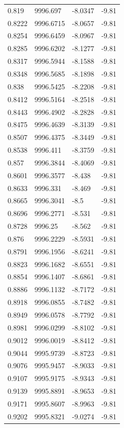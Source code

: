 \begin{table}[H]
\begin{tabular}{llll}
0.819 & 9996.697 & -8.0347 & -9.81 \\
0.8222 & 9996.6715 & -8.0657 & -9.81 \\
0.8254 & 9996.6459 & -8.0967 & -9.81 \\
0.8285 & 9996.6202 & -8.1277 & -9.81 \\
0.8317 & 9996.5944 & -8.1588 & -9.81 \\
0.8348 & 9996.5685 & -8.1898 & -9.81 \\
0.838 & 9996.5425 & -8.2208 & -9.81 \\
0.8412 & 9996.5164 & -8.2518 & -9.81 \\
0.8443 & 9996.4902 & -8.2828 & -9.81 \\
0.8475 & 9996.4639 & -8.3139 & -9.81 \\
0.8507 & 9996.4375 & -8.3449 & -9.81 \\
0.8538 & 9996.411 & -8.3759 & -9.81 \\
0.857 & 9996.3844 & -8.4069 & -9.81 \\
0.8601 & 9996.3577 & -8.438 & -9.81 \\
0.8633 & 9996.331 & -8.469 & -9.81 \\
0.8665 & 9996.3041 & -8.5 & -9.81 \\
0.8696 & 9996.2771 & -8.531 & -9.81 \\
0.8728 & 9996.25 & -8.562 & -9.81 \\
0.876 & 9996.2229 & -8.5931 & -9.81 \\
0.8791 & 9996.1956 & -8.6241 & -9.81 \\
0.8823 & 9996.1682 & -8.6551 & -9.81 \\
0.8854 & 9996.1407 & -8.6861 & -9.81 \\
0.8886 & 9996.1132 & -8.7172 & -9.81 \\
0.8918 & 9996.0855 & -8.7482 & -9.81 \\
0.8949 & 9996.0578 & -8.7792 & -9.81 \\
0.8981 & 9996.0299 & -8.8102 & -9.81 \\
0.9012 & 9996.0019 & -8.8412 & -9.81 \\
0.9044 & 9995.9739 & -8.8723 & -9.81 \\
0.9076 & 9995.9457 & -8.9033 & -9.81 \\
0.9107 & 9995.9175 & -8.9343 & -9.81 \\
0.9139 & 9995.8891 & -8.9653 & -9.81 \\
0.9171 & 9995.8607 & -8.9963 & -9.81 \\
0.9202 & 9995.8321 & -9.0274 & -9.81 \\

\end{tabular}
\end{table}
